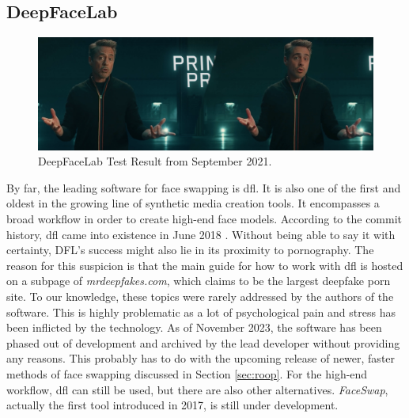 \documentclass[
  a4paper,  %
  twoside,  %
  bibliography=totoc,
  headsepline,
  cleardoublepage=empty,
  parskip=half,
  draft=false
]{scrbook}
\begin{document}
\subsection{DeepFaceLab}
\begin{figure}[h]
  \centering
  \includegraphics[width=1\textwidth]{./graphics/dfl-demo.png}
  \caption{DeepFaceLab Test Result from September 2021.}
  \label{fig:dfl-sample}
\end{figure}
By far, the leading software for face swapping is \gls{dfl}. It is also one of the first and oldest in the growing line of synthetic media creation tools. It encompasses a broad workflow in order to create high-end face models. According to the commit history, \gls{dfl} came into existence in June 2018 \cite{iperovCommitsIperovDeepFaceLab}. Without being able to say it with certainty, DFL's success might also lie in its proximity to pornography. The reason for this suspicion is that the main guide for how to work with \gls{dfl} is hosted on a subpage of \textit{mrdeepfakes.com}, which claims to be the largest deepfake porn site. To our knowledge, these topics were rarely addressed by the authors of the software. This is highly problematic as a lot of psychological pain and stress has been inflicted by the technology. As of November 2023, the software has been phased out of development and archived by the lead developer without providing any reasons. This probably has to do with the upcoming release of newer, faster methods of face swapping discussed in Section \ref{sec:roop}. For the high-end workflow, \gls{dfl} can still be used, but there are also other alternatives. \textit{FaceSwap}, actually the first tool introduced in 2017, is still under development.
\end{document}

